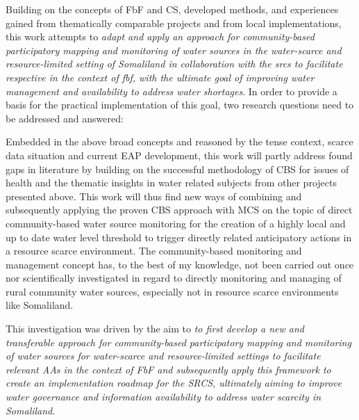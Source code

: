 Building on the concepts of FbF and CS, developed methods, and experiences gained from thematically comparable projects and from local implementations, this work attempts to \textit{adapt and apply an approach for community-based participatory mapping and monitoring of water sources in the water-scarce and resource-limited setting of Somaliland in collaboration with the \acrshort{srcs} to facilitate respective  in the context of \acrlong{fbf}, with the ultimate goal of improving water management and availability to address water shortages}. In order to provide a basis for the practical implementation of this goal, two research questions need to be addressed and answered:

Embedded in the above broad concepts and reasoned by the tense context, scarce data situation and current EAP development, this work will partly address found gaps in literature by building on the successful methodology of CBS for issues of health and the thematic insights in water related subjects from other projects presented above. This work will thus find new ways of combining and subsequently applying the proven CBS approach with MCS on the topic of direct community-based water source monitoring for the creation of a highly local and up to date water level threshold to trigger directly related anticipatory actions in a resource scarce environment.\newline
The community-based monitoring and management concept has, to the best of my knowledge, not been carried out once nor scientifically investigated in regard to directly monitoring and managing of rural community water sources, especially not in resource scarce environments like Somaliland.

This investigation was driven by the aim to \textit{to first develop a new and transferable approach for community-based participatory mapping and monitoring of water sources for water-scarce and resource-limited settings to facilitate relevant AAs in the context of FbF and subsequently apply this framework to create an implementation roadmap for the SRCS, ultimately aiming to improve water governance and information availability to address water scarcity in Somaliland}.


